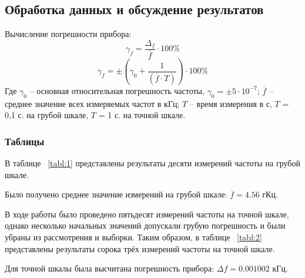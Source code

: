 \subsection{Обработка данных и обсуждение результатов}

Вычисление погрешности прибора:
\begin{equation}
\label{eq:1}
   \gamma_f=  \frac{\Delta_f}{\overline{f}} \cdot 100\%
\end{equation}
\begin{equation}
\label{eq:2}
 \gamma_f=\pm(\gamma_0+\frac{1}{(\overline{f} \cdot T)}) \cdot 100\%
 \end{equation}
 Где  $\gamma_0$  -- основная относительная погрешность частоты, $ \gamma_0 = \pm5 \cdot 10^{-7} $; $\overline{f}$ -- среднее значение всех измеряемых частот в кГц; $T$ -- время измерения в с, $T$ = 0,1 с. на грубой шкале, $T$ = 1 с. на точной шкале.
 
\subsubsection{Таблицы}

В таблице ~\ref{tabl:1} представлены результаты десяти измерений частоты на грубой шкале.

Было получено среднее значение измерений на грубой шкале: $\overline{f} = 4.56 $ гКц.

В ходе работы было проведено пятьдесят измерений частоты на точной шкале, однако несколько начальных значений допускали грубую погрешность и были убраны из рассмотрения и выборки. Таким образом, в таблице ~\ref{tabl:2} представлены результаты сорока трёх измерений частоты на точной шкале.

Для точной шкалы была высчитана погрешность прибора: $\Delta f = 0.001002$ кГц.


